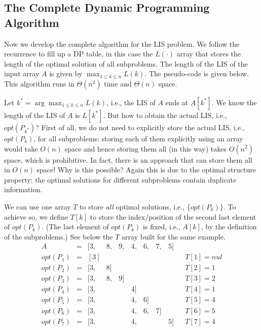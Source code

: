 \subsection*{The Complete Dynamic Programming Algorithm}

Now we develop the complete algorithm for the LIS problem.
We follow the recurrence to fill up a DP table, in this case the $L(\cdot)$ array
that stores the length of the optimal solution of all subproblems.
The length of the LIS of the input array $A$ is given by $\max_{1\le k \le n} L(k)$.
The pseudo-code is given below. 
This algorithm runs in $\Theta(n^2)$ time and $\Theta(n)$ space.

\begin{algorithmblock}[0.8\textwidth]
	\xxx
	\xxx
	\xxx
	\xxx
	\xxx
	\xxx
\end{algorithmblock}

Let $k^* = \arg\max_{1\le k \le n} L(k)$, i.e., the LIS of $A$ ends at $A[k^*]$.
We know the length of the LIS of $A$ is $L[k^*]$.
But how to obtain the actual LIS, i.e., $opt(P_{k^*})$? 
First of all, we do not need to explicitly store the actual LIS, i.e., $opt(P_k)$, for all subproblems:
storing each of them explicitly using an array would take $O(n)$ space and
hence storing them all (in this way) takes $O(n^2)$ space, which is prohibitive.
In fact, there is an approach that can store them all in $O(n)$ space!
Why is this possible? Again this is due to the optimal structure property:
the optimal solutions for different subproblems contain duplicate information.

We can use one array $T$ to store \emph{all} optimal solutions, i.e., $\{opt(P_k)\}$. 
To achieve so, 
we define $T[k]$ to store the index/position of the second last element of $opt(P_k)$.
(The last element of $opt(P_k)$ is fixed, i.e., $A[k]$, by the definition of the subproblems.)
See below the $T$ array built for the same example.
\begin{displaymath}
\begin{array}{rllllllllllll}
A & = & [3, &8, &9, &4, &6, &7, &5] \\
opt(P_1) &=& [3]  &&&&&& && T[1] = nul\\
opt(P_2) &=& [3, &8] &&&&&&& T[2] = 1\\
opt(P_3) &=& [3, &8, &9] &&&&&& T[3] = 2\\
opt(P_4) &=& [3, &&&4] &&&&& T[4] = 1\\
opt(P_5) &=& [3, &&&4, &6] &&&& T[5] = 4\\
opt(P_6) &=& [3, &&&4, &6, &7] &&& T[6] = 5\\
opt(P_7) &=& [3, &&&4, &&&5] && T[7] = 4\\
\end{array}
\end{displaymath}

